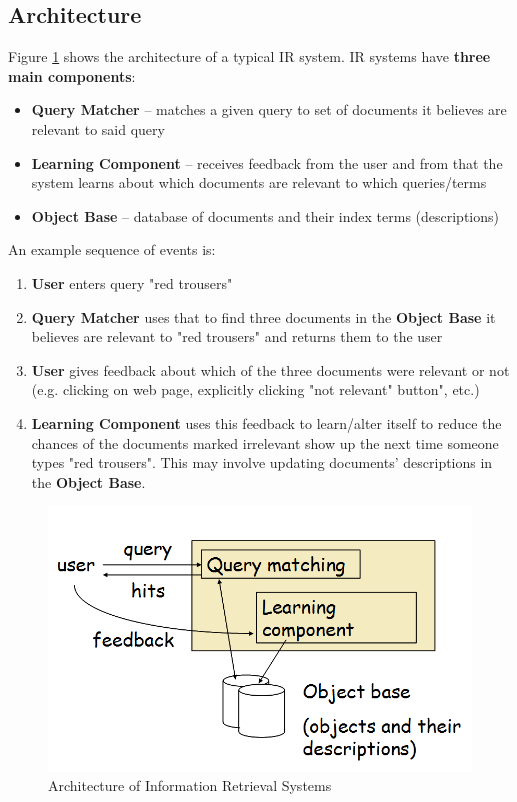 \documentclass{article}
\begin{document}
\subsection{Architecture}

Figure \ref{fig:ir-architecture} shows the architecture of a typical IR system. IR systems have \textbf{three main components}:
\begin{itemize}
	\item \textbf{Query Matcher} -- matches a given query to set of documents it believes are relevant to said query
	\item \textbf{Learning Component} -- receives feedback from the user and from that the system learns about which documents are relevant to which queries/terms
	\item \textbf{Object Base} -- database of documents and their index terms (descriptions)
\end{itemize}

An example sequence of events is:
\begin{enumerate}
	\item \textbf{User} enters query "red trousers"
	\item \textbf{Query Matcher} uses that to find three documents in the \textbf{Object Base} it believes are relevant to "red trousers" and returns them to the user
	\item \textbf{User} gives feedback about which of the three documents were relevant or not (e.g. clicking on web page, explicitly clicking "not relevant" button", etc.)
	\item \textbf{Learning Component} uses this feedback to learn/alter itself to reduce the chances of the documents marked irrelevant show up the next time someone types "red trousers". This may involve updating documents' descriptions in the \textbf{Object Base}.
\end{enumerate}

\begin{figure}
	\centering
	\includegraphics[scale=0.4]{figures/ir-system-architecture.png}
	\caption{Architecture of Information Retrieval Systems}
	\label{fig:ir-architecture}
\end{figure}
\end{document}
